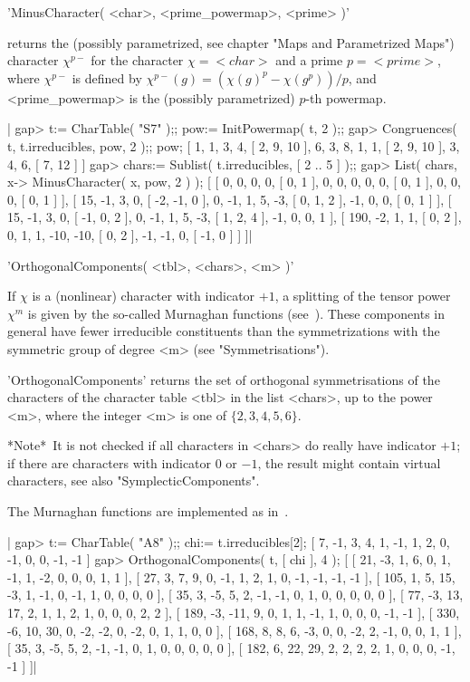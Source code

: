 'MinusCharacter( <char>, <prime\_powermap>, <prime> )'

returns the (possibly  parametrized, see  chapter "Maps and  Parametrized
Maps") character $\chi^{p-}$   for the character  $\chi =   <char>$ and a
prime $p  = <prime>$, where $\chi^{p-}$  is defined  by $\chi^{p-}(g) = (
\chi(g)^p -   \chi(g^p) ) /  p$,  and <prime\_powermap> is  the (possibly
parametrized) $p$-th powermap.

|    gap> t:= CharTable( "S7" );; pow:= InitPowermap( t, 2 );;
    gap> Congruences( t, t.irreducibles, pow, 2 );; pow;
    [ 1, 1, 3, 4, [ 2, 9, 10 ], 6, 3, 8, 1, 1, [ 2, 9, 10 ], 3, 4, 6,
      [ 7, 12 ] ]
    gap> chars:= Sublist( t.irreducibles, [ 2 .. 5 ] );;
    gap> List( chars, x-> MinusCharacter( x, pow, 2 ) );
    [ [ 0, 0, 0, 0, [ 0, 1 ], 0, 0, 0, 0, 0, [ 0, 1 ], 0, 0, 0, [ 0, 1 ] ],
      [ 15, -1, 3, 0, [ -2, -1, 0 ], 0, -1, 1, 5, -3, [ 0, 1, 2 ], -1, 0,
          0, [ 0, 1 ] ],
      [ 15, -1, 3, 0, [ -1, 0, 2 ], 0, -1, 1, 5, -3, [ 1, 2, 4 ], -1, 0,
          0, 1 ],
      [ 190, -2, 1, 1, [ 0, 2 ], 0, 1, 1, -10, -10, [ 0, 2 ], -1, -1, 0,
          [ -1, 0 ] ] ]|

%
%
%

'OrthogonalComponents( <tbl>, <chars>, <m> )'

If $\chi$ is a (nonlinear) character with  indicator $+1$, a splitting of
the tensor power $\chi^m$  is given by  the so-called Murnaghan functions
(see~\cite{Mur58}).  These components  in general  have fewer irreducible
constituents than the symmetrizations  with the symmetric group of degree
<m> (see "Symmetrisations").

'OrthogonalComponents' returns  the set of  orthogonal symmetrisations of
the characters of  the character table <tbl> in  the list <chars>, up  to
the power <m>, where the integer <m> is one of $\{ 2, 3, 4, 5, 6 \}$.

*Note*\:\ It is not checked  if all characters in <chars>  do really have
indicator $+1$;  if there are characters   with indicator 0  or $-1$, the
result might contain virtual characters, see also "SymplecticComponents".

The Murnaghan functions are implemented as in~\cite{Fra82}.

|    gap> t:= CharTable( "A8" );; chi:= t.irreducibles[2];
    [ 7, -1, 3, 4, 1, -1, 1, 2, 0, -1, 0, 0, -1, -1 ]
    gap> OrthogonalComponents( t, [ chi ], 4 );
    [ [ 21, -3, 1, 6, 0, 1, -1, 1, -2, 0, 0, 0, 1, 1 ],
      [ 27, 3, 7, 9, 0, -1, 1, 2, 1, 0, -1, -1, -1, -1 ],
      [ 105, 1, 5, 15, -3, 1, -1, 0, -1, 1, 0, 0, 0, 0 ],
      [ 35, 3, -5, 5, 2, -1, -1, 0, 1, 0, 0, 0, 0, 0 ],
      [ 77, -3, 13, 17, 2, 1, 1, 2, 1, 0, 0, 0, 2, 2 ],
      [ 189, -3, -11, 9, 0, 1, 1, -1, 1, 0, 0, 0, -1, -1 ],
      [ 330, -6, 10, 30, 0, -2, -2, 0, -2, 0, 1, 1, 0, 0 ],
      [ 168, 8, 8, 6, -3, 0, 0, -2, 2, -1, 0, 0, 1, 1 ],
      [ 35, 3, -5, 5, 2, -1, -1, 0, 1, 0, 0, 0, 0, 0 ],
      [ 182, 6, 22, 29, 2, 2, 2, 2, 1, 0, 0, 0, -1, -1 ] ]|

